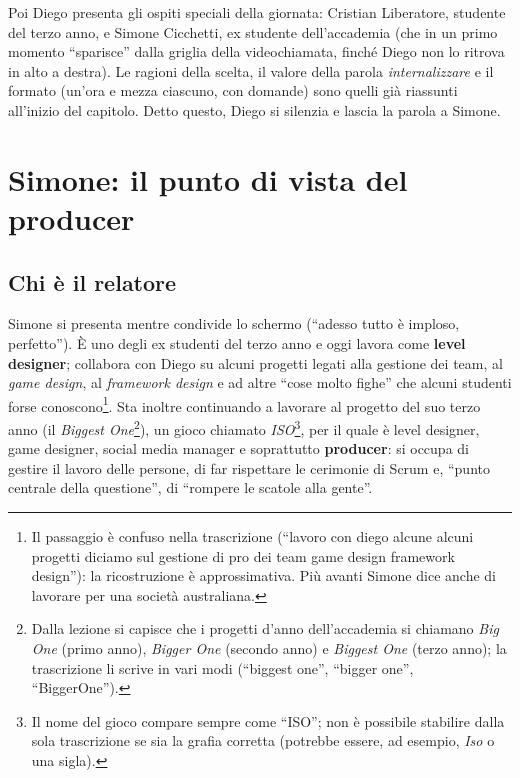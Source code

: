 Poi Diego presenta gli ospiti speciali della giornata: Cristian Liberatore,
studente del terzo anno, e Simone Cicchetti, ex studente dell'accademia (che
in un primo momento ``sparisce'' dalla griglia della videochiamata, finché
Diego non lo ritrova in alto a destra). Le ragioni della scelta, il valore
della parola \emph{internalizzare} e il formato (un'ora e mezza ciascuno, con
domande) sono quelli già riassunti all'inizio del capitolo. Detto questo,
Diego si silenzia e lascia la parola a Simone.

\section{Simone: il punto di vista del producer}
\label{sec:z3-simone}

\subsection{Chi è il relatore}

Simone si presenta mentre condivide lo schermo (``adesso tutto è imploso,
perfetto''). È uno degli ex studenti del terzo anno e oggi lavora come
\textbf{level designer}; collabora con Diego su alcuni progetti legati alla
gestione dei team, al \emph{game design}, al \emph{framework design} e ad
altre ``cose molto fighe'' che alcuni studenti forse conoscono\footnote{Il
passaggio è confuso nella trascrizione (``lavoro con diego alcune alcuni
progetti diciamo sul gestione di pro dei team game design framework
design''): la ricostruzione è approssimativa. Più avanti Simone dice anche di
lavorare per una società australiana.}. Sta inoltre continuando a lavorare al
progetto del suo terzo anno (il \emph{Biggest One}\footnote{Dalla lezione
si capisce che i progetti d'anno dell'accademia si chiamano \emph{Big One}
(primo anno), \emph{Bigger One} (secondo anno) e \emph{Biggest One} (terzo
anno); la trascrizione li scrive in vari modi (``biggest one'', ``bigger
one'', ``BiggerOne'').}), un gioco chiamato \emph{ISO}\footnote{Il nome del
gioco compare sempre come ``ISO''; non è possibile stabilire dalla sola
trascrizione se sia la grafia corretta (potrebbe essere, ad esempio,
\emph{Iso} o una sigla).}, per il quale è level designer, game designer,
social media manager e soprattutto \textbf{producer}: si occupa di gestire il
lavoro delle persone, di far rispettare le cerimonie di Scrum e, ``punto
centrale della questione'', di ``rompere le scatole alla gente''.

